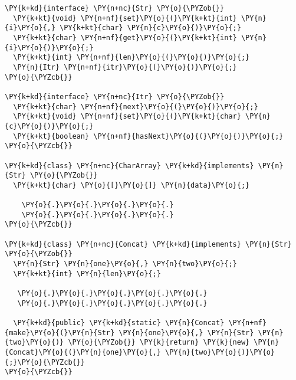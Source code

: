 \begin{Verbatim}[commandchars=\\\{\}]
\PY{k+kd}{interface} \PY{n+nc}{Str} \PY{o}{\PYZob{}}
  \PY{k+kt}{void} \PY{n+nf}{set}\PY{o}{(}\PY{k+kt}{int} \PY{n}{i}\PY{o}{,} \PY{k+kt}{char} \PY{n}{c}\PY{o}{)}\PY{o}{;}
  \PY{k+kt}{char} \PY{n+nf}{get}\PY{o}{(}\PY{k+kt}{int} \PY{n}{i}\PY{o}{)}\PY{o}{;}
  \PY{k+kt}{int} \PY{n+nf}{len}\PY{o}{(}\PY{o}{)}\PY{o}{;}
  \PY{n}{Itr} \PY{n+nf}{itr}\PY{o}{(}\PY{o}{)}\PY{o}{;}
\PY{o}{\PYZcb{}}

\PY{k+kd}{interface} \PY{n+nc}{Itr} \PY{o}{\PYZob{}}
  \PY{k+kt}{char} \PY{n+nf}{next}\PY{o}{(}\PY{o}{)}\PY{o}{;}
  \PY{k+kt}{void} \PY{n+nf}{set}\PY{o}{(}\PY{k+kt}{char} \PY{n}{c}\PY{o}{)}\PY{o}{;} 
  \PY{k+kt}{boolean} \PY{n+nf}{hasNext}\PY{o}{(}\PY{o}{)}\PY{o}{;}
\PY{o}{\PYZcb{}}

\PY{k+kd}{class} \PY{n+nc}{CharArray} \PY{k+kd}{implements} \PY{n}{Str} \PY{o}{\PYZob{}}
  \PY{k+kt}{char} \PY{o}{[}\PY{o}{]} \PY{n}{data}\PY{o}{;}
       
    \PY{o}{.}\PY{o}{.}\PY{o}{.}\PY{o}{.}
    \PY{o}{.}\PY{o}{.}\PY{o}{.}\PY{o}{.}      
\PY{o}{\PYZcb{}}

\PY{k+kd}{class} \PY{n+nc}{Concat} \PY{k+kd}{implements} \PY{n}{Str} \PY{o}{\PYZob{}}
  \PY{n}{Str} \PY{n}{one}\PY{o}{,} \PY{n}{two}\PY{o}{;}
  \PY{k+kt}{int} \PY{n}{len}\PY{o}{;}

   \PY{o}{.}\PY{o}{.}\PY{o}{.}\PY{o}{.}\PY{o}{.}
   \PY{o}{.}\PY{o}{.}\PY{o}{.}\PY{o}{.}\PY{o}{.}

  \PY{k+kd}{public} \PY{k+kd}{static} \PY{n}{Concat} \PY{n+nf}{make}\PY{o}{(}\PY{n}{Str} \PY{n}{one}\PY{o}{,} \PY{n}{Str} \PY{n}{two}\PY{o}{)} \PY{o}{\PYZob{}} \PY{k}{return} \PY{k}{new} \PY{n}{Concat}\PY{o}{(}\PY{n}{one}\PY{o}{,} \PY{n}{two}\PY{o}{)}\PY{o}{;}\PY{o}{\PYZcb{}}
\PY{o}{\PYZcb{}}
\end{Verbatim}
